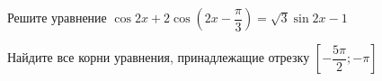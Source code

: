 \begin{ex}
	\begin{condition}
		\begin{enumcols}[label=\asbuk*)]
			\item Решите уравнение \(\cos 2x + 2\cos{\left(2x-  \dfrac{\pi}{3}\right)} =\sqrt{3} \sin 2x - 1  \)
			\item Найдите все корни уравнения, принадлежащие отрезку \(  \left[-\dfrac{5\pi}{2};-\pi\right] \)
		\end{enumcols}
	\end{condition}
\end{ex}